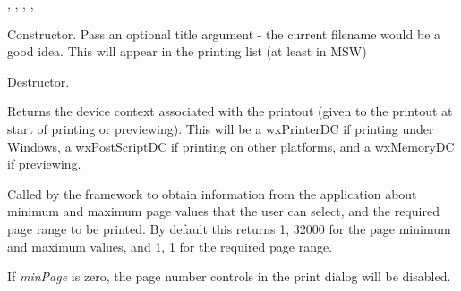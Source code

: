 
, , ,\rtfsp
{}, 



\label{wxprintoutctor}


Constructor. Pass an optional title argument - the current filename would be a good idea. This will appear in the printing list
(at least in MSW)


\label{wxprintoutdtor}


Destructor.


\label{wxprintoutgetdc}


Returns the device context associated with the printout (given to the printout at start of
printing or previewing). This will be a wxPrinterDC if printing under Windows,
a wxPostScriptDC if printing on other platforms, and a wxMemoryDC if previewing.


\label{wxprintoutgetpageinfo}


Called by the framework to obtain information from the application about minimum and maximum page values that
the user can select, and the required page range to be printed. By default this
returns 1, 32000 for the page minimum and maximum values, and 1, 1 for the required page range.

If {\it minPage} is zero, the page number controls in the print dialog will be disabled.




